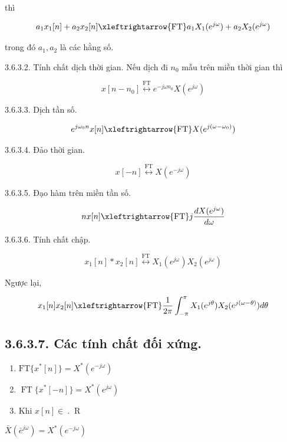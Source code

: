 \documentclass[
  10
]{article}
\begin{document}
thì

\[
a _ {1} x _ {1} [ n ] + a _ {2} x _ {2} [ n ] \xleftrightarrow {\mathrm{FT}} a _ {1} X _ {1} (e ^ {j \omega}) + a _ {2} X _ {2} (e ^ {j \omega})
\]

trong đó \(a _ { 1 } , a _ { 2 }\) là các hằng số.

3.6.3.2. Tính chất dịch thời gian. Nếu dịch đi \(n _ { 0 }\) mẫu trên
miền thời gian thì

\[
x [ n - n _ {0} ] \stackrel {\mathrm{FT}} {\longleftrightarrow} e ^ {- j \omega n _ {0}} X (e ^ {j \omega})
\]

3.6.3.3. Dịch tần số.

\[
e ^ {j \omega_ {0} n} x [ n ] \xleftrightarrow {\mathrm{FT}} X (e ^ {j (\omega - \omega_ {0})})
\]

3.6.3.4. Đảo thời gian.

\[
x [ - n ] \stackrel {\mathrm{FT}} {\longleftrightarrow} X (e ^ {- j \omega})
\]

3.6.3.5. Đạo hàm trên miền tần số.

\[
n x [ n ] \xleftrightarrow {\mathrm{FT}} j \frac {d X (e ^ {j \omega})}{d \omega}
\]

3.6.3.6. Tính chất chập.

\[
x _ {1} [ n ] * x _ {2} [ n ] \stackrel {\mathrm{FT}} {\longleftrightarrow} X _ {1} (e ^ {j \omega}) X _ {2} (e ^ {j \omega})
\]

Ngược lại,

\[
x _ {1} [ n ] x _ {2} [ n ] \xleftrightarrow {\mathrm{FT}} \frac {1}{2 \pi} \int_ {- \pi} ^ {\pi} X _ {1} (e ^ {j \theta}) X _ {2} (e ^ {j (\omega - \theta)}) d \theta
\]

\subsection{3.6.3.7. Các tính chất đối
xứng.}\label{cuxe1c-tuxednh-chux1ea5t-ux111ux1ed1i-xux1ee9ng.}

\begin{enumerate}
\def\labelenumi{(\alph{enumi})}
\item
  \(\mathrm { F T } \{ x ^ { * } [ n ] \} = X ^ { * } ( e ^ { - j \omega } )\)
\item
  \(\operatorname { F T } \{ x ^ { * } [ - n ] \} = X ^ { * } ( e ^ { j \omega } )\)
\item
  Khi \(x [ n ] \in { \mathrm { ~ . ~ } }\) R
\end{enumerate}

\(\bar { X } ( \bar { e } ^ { j \omega } ) = X ^ { * } ( e ^ { - j \omega } )\)
\end{document}
